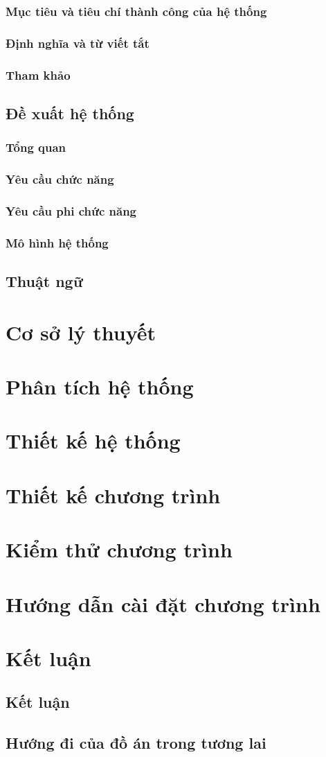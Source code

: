 \documentclass[a4paper,12pt]{article}
\begin{document}
\subsubsection{Mục tiêu và tiêu chí thành công của hệ thống}
\subsubsection{Định nghĩa và từ viết tắt}
\subsubsection{Tham khảo}
\subsection{Đề xuất hệ thống}
\subsubsection{Tổng quan}
\subsubsection{Yêu cầu chức năng}
\subsubsection{Yêu cầu phi chức năng}
\subsubsection{Mô hình hệ thống}
\subsection{Thuật ngữ}
\section{Cơ sở lý thuyết}
\section{Phân tích hệ thống}
\section{Thiết kế hệ thống}
\section{Thiết kế chương trình}
\section{Kiểm thử chương trình}
\section{Hướng dẫn cài đặt chương trình}
\section{Kết luận}
\subsection{Kết luận}
\subsection{Hướng đi của đồ án trong tương lai}
\end{document}
